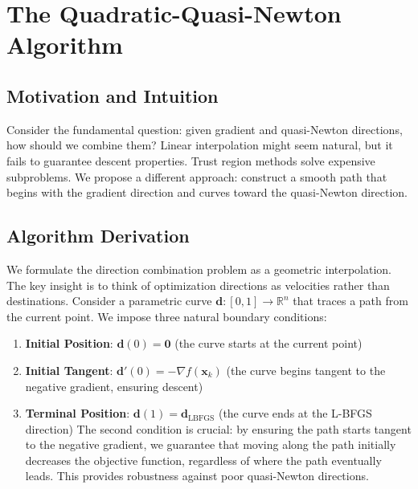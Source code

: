 \hypertarget{the-quadratic-quasi-newton-algorithm}{%
\section{The Quadratic-Quasi-Newton Algorithm}\label{the-quadratic-quasi-newton-algorithm}}

\hypertarget{motivation-and-intuition}{%
\subsection{Motivation and Intuition}\label{motivation-and-intuition}}

Consider the fundamental question: given gradient and quasi-Newton directions, how should we combine them?
Linear interpolation might seem natural, but it fails to guarantee descent properties.
Trust region methods solve expensive subproblems.
We propose a different approach: construct a smooth path that begins with the gradient direction and curves toward the quasi-Newton direction.

\hypertarget{algorithm-derivation}{%
\subsection{Algorithm Derivation}\label{algorithm-derivation}}

We formulate the direction combination problem as a geometric interpolation. The key insight is to think of optimization directions as velocities rather than destinations. Consider a parametric curve
\(\mathbf{d}: [0,1] \rightarrow \mathbb{R}^n\) that traces a path from the current point. We impose three natural boundary conditions:

\begin{enumerate}
\def\labelenumi{\arabic{enumi}.}
\item
  \textbf{Initial Position}: \(\mathbf{d}(0) = \mathbf{0}\) (the curve starts at the current point)
\item
  \textbf{Initial Tangent}: \(\mathbf{d}'(0) = -\nabla f(\mathbf{x}_k)\) (the curve begins tangent to the negative gradient, ensuring descent)
\item
  \textbf{Terminal Position}: \(\mathbf{d}(1) = \mathbf{d}_{\text{LBFGS}}\) (the curve ends at the L-BFGS direction)
  The second condition is crucial: by ensuring the path starts tangent to the negative gradient, we guarantee that moving along the path initially decreases the objective function, regardless of where the path eventually leads. This provides robustness against poor quasi-Newton directions.
\end{enumerate}

